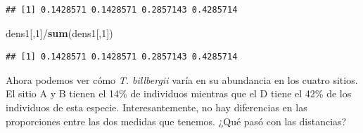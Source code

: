 \documentclass[]{book}
\newenvironment{Shaded}{\begin{snugshade}}{\end{snugshade}}
\newcommand{\KeywordTok}[1]{\textcolor[rgb]{0.13,0.29,0.53}{\textbf{{#1}}}}
\newcommand{\DecValTok}[1]{\textcolor[rgb]{0.00,0.00,0.81}{{#1}}}
\newcommand{\NormalTok}[1]{{#1}}
\begin{document}
\begin{verbatim}
## [1] 0.1428571 0.1428571 0.2857143 0.4285714
\end{verbatim}

\begin{Shaded}
\begin{Highlighting}[]
\NormalTok{dens1[,}\DecValTok{1}\NormalTok{]/}\KeywordTok{sum}\NormalTok{(dens1[,}\DecValTok{1}\NormalTok{])}
\end{Highlighting}
\end{Shaded}

\begin{verbatim}
## [1] 0.1428571 0.1428571 0.2857143 0.4285714
\end{verbatim}

Ahora podemos ver cómo \emph{T. billbergii} varía en su abundancia en
los cuatro sitios. El sitio A y B tienen el 14\% de individuos mientras
que el D tiene el 42\% de los individuos de esta especie.
Interesantemente, no hay diferencias en las proporciones entre las dos
medidas que tenemos. ¿Qué pasó con las distancias?
\end{document}
